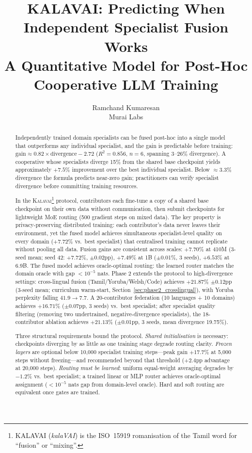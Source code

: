 \documentclass{article}
\title{KALAVAI: Predicting When Independent Specialist Fusion Works\\
       A Quantitative Model for Post-Hoc Cooperative LLM Training}
\author{%
  Ramchand Kumaresan \\
  Murai Labs
}
\newcommand{\kalavai}{\textsc{Kalavai}\xspace}
\begin{document}
\maketitle

\begin{abstract}
Independently trained domain specialists can be fused post-hoc into a single model that outperforms any individual specialist, and the gain is predictable before training:
$\text{gain} \approx 0.82 \times \text{divergence} - 2.72$ ($R^2 = 0.856$, $n=6$, spanning 3--26\% divergence).
A cooperative whose specialists diverge 15\% from the shared base checkpoint yields approximately $+7.5\%$ improvement over the best individual specialist.
Below $\approx$3.3\% divergence the formula predicts near-zero gain; practitioners can verify specialist divergence before committing training resources.

In the \kalavai\footnote{KALAVAI (\textit{kalaVAI}) is the ISO~15919 romanisation of the Tamil word for ``fusion'' or ``mixing''.} protocol, contributors each fine-tune a copy of a shared base checkpoint on their own data without communication, then submit checkpoints for lightweight MoE routing (500 gradient steps on mixed data).
The key property is privacy-preserving distributed training: each contributor's data never leaves their environment, yet the fused model achieves simultaneous specialist-level quality on every domain ($+7.72\%$ vs.\ best specialist) that centralised training cannot replicate without pooling all data.
Fusion gains are consistent across scales: $+7.70\%$ at 410M (3-seed mean; seed 42: $+7.72\%$, $\pm$0.02pp), $+7.49\%$ at 1B ($\pm$0.01\%, 3 seeds), $+6.53\%$ at 6.9B.
The fused model achieves oracle-optimal routing: the learned router matches the domain oracle with gap $<10^{-5}$ nats.
Phase 2 extends the protocol to high-divergence settings: cross-lingual fusion (Tamil/Yoruba/Welsh/Code) achieves $+21.87\%$ $\pm$0.12pp (3-seed mean; curriculum warm-start, Section~\ref{sec:phase2_crosslingual}), with Yoruba perplexity falling $41.9\to7.7$.
A 20-contributor federation (10 languages + 10 domains) achieves $+16.71\%$ ($\pm$0.07pp, 3 seeds) vs.\ best specialist; after specialist quality filtering (removing two undertrained, negative-divergence specialists), the 18-contributor ablation achieves $+21.13\%$ ($\pm$0.01pp, 3 seeds, mean divergence 19.75\%).

Three structural requirements bound the protocol. \emph{Shared initialisation} is necessary: checkpoints diverging by as little as one training stage degrade routing clarity. \emph{Frozen layers} are optional below 10,000 specialist training steps---peak gain $+17.7\%$ at 5,000 steps without freezing---and recommended beyond that threshold ($+2.4$pp advantage at 20,000 steps). \emph{Routing must be learned}: uniform equal-weight averaging degrades by $-1.2\%$ vs.\ best specialist; a trained linear or MLP router achieves oracle-optimal assignment ($<10^{-5}$ nats gap from domain-level oracle). Hard and soft routing are equivalent once gates are trained.
\end{abstract}
\end{document}
